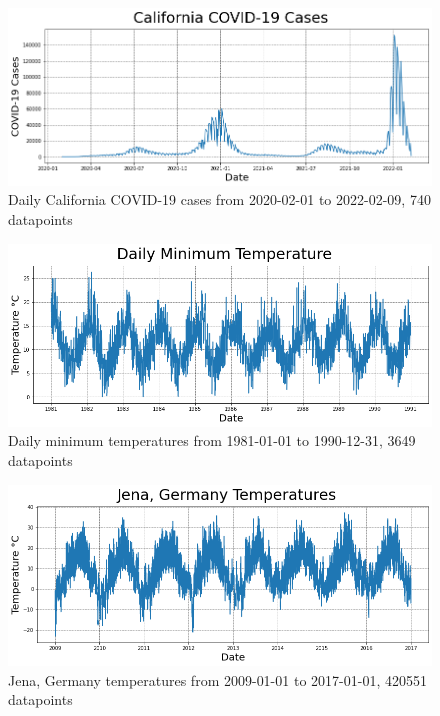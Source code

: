 \documentclass[conference]{IEEEtran}
\begin{document}
\begin{figure}
\begin{center}
\includegraphics[scale=0.50]{CA_COVID19_time_series.png}
\caption{Daily California COVID-19 cases from 2020-02-01 to 2022-02-09, 740 datapoints}
\label{fig:CA_COVID19_time_series}
\end{center}
\end{figure}

\begin{figure}
\begin{center}
\includegraphics[scale=0.50]{DailyMinTemp_time_series.png}
\caption{Daily minimum temperatures from 1981-01-01 to 1990-12-31, 3649 datapoints}
\label{fig:DailyMinTemp_time_series}
\end{center}
\end{figure}

\begin{figure}
\begin{center}
\includegraphics[scale=0.50]{Jena_time_series.png}
\caption{Jena, Germany temperatures from 2009-01-01 to 2017-01-01, 420551 datapoints}
\label{fig:Jena_time_series}
\end{center}
\end{figure}
\end{document}

